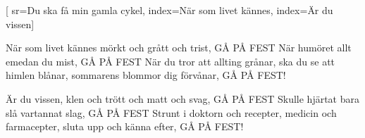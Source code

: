 [ 							
	sr={Du ska få min gamla cykel},					
	index={När som livet kännes},
	index={Är du vissen}]		
	
\beginverse*						
När som livet kännes mörkt och grått och trist,
GÅ PÅ FEST
När humöret allt emedan du mist,
GÅ PÅ FEST
När du tror att allting grånar, 
ska du se att himlen blånar, 
sommarens blommor dig förvånar, 
GÅ PÅ FEST!
\endverse						

\beginverse				
Är du vissen, klen och trött och matt och svag, 
GÅ PÅ FEST
Skulle hjärtat bara slå vartannat slag, 
GÅ PÅ FEST
Strunt i doktorn och recepter, 
medicin och farmacepter, 
sluta upp och känna efter, 
GÅ PÅ FEST!
\endverse				
\endsong		
